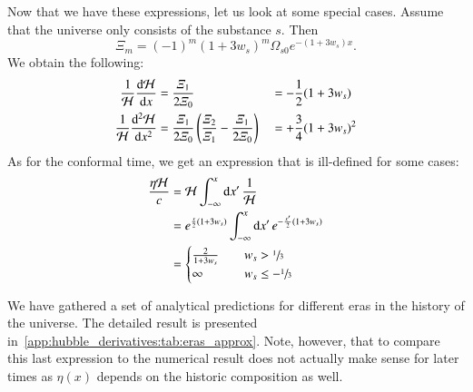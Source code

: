 Now that we have these expressions, let us look at some special cases. Assume that the universe only consists of the substance $s$. Then
\begin{equation}
    \varXi_m = (-1)^m(1+3w_s)^m \Omega_{s0}e^{-(1+3w_s)x}.
\end{equation}
We obtain the following:
\begin{subequations}
    \begin{align}
        \frac{1}{\mathcal{H}} \dv{\mathcal{H}}{x} &= \frac{\varXi_1}{2\varXi_0} &&= - \frac{1}{2}(1+3w_s) \\
        \frac{1}{\mathcal{H}} \dv[2]{\mathcal{H}}{x} &= \frac{\varXi_1}{2\varXi_0} \left( \frac{\varXi_2}{\varXi_1}- \frac{\varXi_1}{2\varXi_0}  \right) &&=+ \frac{3}{4}(1+3w_s)^2
    \end{align}
\end{subequations}
As for the conformal time, we get an expression that is ill-defined for some cases:
\begin{equation}
    \begin{split}
        \frac{\eta \mathcal{H}}{c} &= \mathcal{H} \int_{-\infty}^{x} \mathrm{d} x'\, \frac{1}{\mathcal{H}} \\
            &= e^{\frac{x}{2}(1+3w_s)} \int_{-\infty}^{x} \mathrm{d} x' \,e^{-\frac{x'}{2}(1+3w_s)} \\
            &= \begin{cases}
                \frac{2}{1+3w_s} \quad& w_s > \sfrac{1}{3} \\
                \infty & w_s \leq -\sfrac{1}{3}
            \end{cases}
    \end{split}
\end{equation}

We have gathered a set of analytical predictions for different eras in the history of the universe. The detailed result is presented in~\cref{app:hubble_derivatives:tab:eras_approx}. Note, however, that to compare this last expression to the numerical result does not actually make sense for later times as $\eta(x)$ depends on the historic composition as well.

